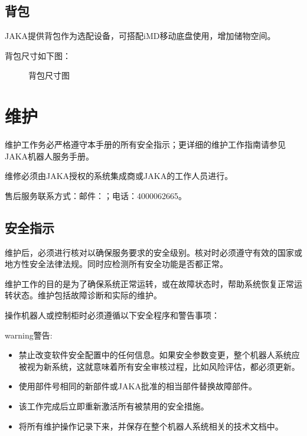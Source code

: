 \documentclass[a4paper,11pt,english,openany,oneside]{sphinxmanual}
\begin{document}
\section{背包}
\label{\detokenize{_u9009_u914d_u8bbe_u5907:id28}}\label{\detokenize{_u9009_u914d_u8bbe_u5907:id29}}
\sphinxAtStartPar
JAKA提供背包作为选配设备，可搭配iM\sphinxhyphen{}D移动底盘使用，增加储物空间。

\sphinxAtStartPar
背包尺寸如下图：

\begin{figure}[H]
\centering
\capstart

\noindent{}
\caption{背包尺寸图}\label{\detokenize{_u9009_u914d_u8bbe_u5907:id41}}\end{figure}

\sphinxstepscope


\chapter{维护}
\label{\detokenize{09 _u7ef4_u62a4:id1}}\label{\detokenize{09 _u7ef4_u62a4::doc}}
\sphinxAtStartPar
维护工作务必严格遵守本手册的所有安全指示；更详细的维护工作指南请参见 JAKA机器人服务手册。

\sphinxAtStartPar
维修必须由JAKA授权的系统集成商或JAKA的工作人员进行。

\sphinxAtStartPar
售后服务联系方式：邮件：；电话：400\sphinxhyphen{}006\sphinxhyphen{}2665。


\section{安全指示}
\label{\detokenize{09 _u7ef4_u62a4:id2}}
\sphinxAtStartPar
维护后，必须进行核对以确保服务要求的安全级别。核对时必须遵守有效的国家或地方性安全法律法规。同时应检测所有安全功能是否都正常。

\sphinxAtStartPar
维护工作的目的是为了确保系统正常运转，或在故障状态时，帮助系统恢复正常运转状态。维护包括故障诊断和实际的维护。

\sphinxAtStartPar
操作机器人或控制柜时必须遵循以下安全程序和警告事项：

\begin{sphinxadmonition}{warning}{警告:}\begin{itemize}
\item {} 
\sphinxAtStartPar
禁止改变软件安全配置中的任何信息。如果安全参数变更，整个机器人系统应被视为新系统，这就意味着所有安全审核过程，比如风险评估，都必须更新。

\item {} 
\sphinxAtStartPar
使用部件号相同的新部件或JAKA批准的相当部件替换故障部件。

\item {} 
\sphinxAtStartPar
该工作完成后立即重新激活所有被禁用的安全措施。

\item {} 
\sphinxAtStartPar
将所有维护操作记录下来，并保存在整个机器人系统相关的技术文档中。

\end{itemize}
\end{sphinxadmonition}
\end{document}
